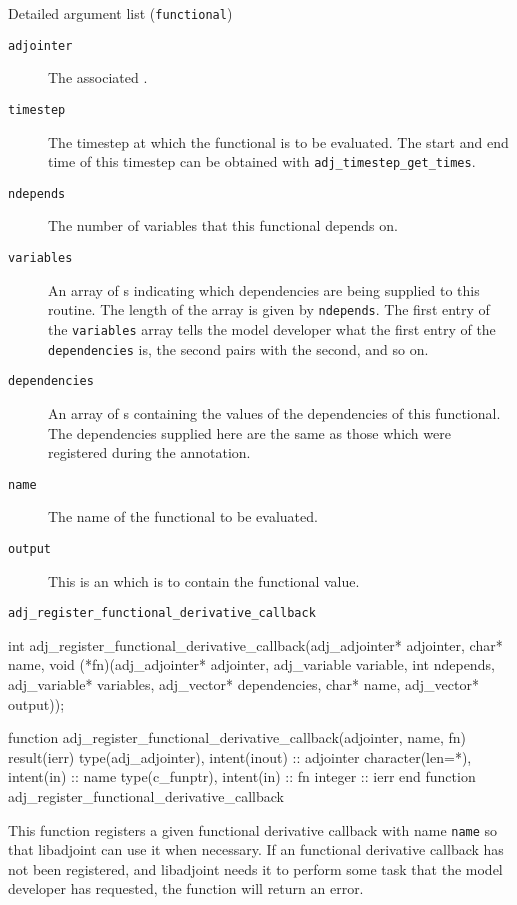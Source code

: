 \begin{boxwithtitle}{Detailed argument list (\texttt{functional})}
\begin{description}
\item[\texttt{adjointer}] The associated .
\item[\texttt{timestep}] The timestep at which the functional is to be evaluated. The start and end time of this timestep can be obtained with \texttt{adj_timestep_get_times}.
\item[\texttt{ndepends}] The number of variables that this functional depends on.
\item[\texttt{variables}] An array of s indicating which dependencies are being supplied to this routine. The length of the
array is given by \texttt{ndepends}. The first entry of the \texttt{variables} array
tells the model developer what the first entry of the \texttt{dependencies} is, the second pairs with the second, and so on.
\item[\texttt{dependencies}] An array of s containing the values of the dependencies of this functional. The dependencies supplied
here are the same as those which were registered during the annotation.
\item[\texttt{name}] The name of the functional to be evaluated.
\item[\texttt{output}] This is an  which is to contain the functional value. 
\end{description}
\end{boxwithtitle}


\begin{boxwithtitle}{\texttt{adj_register_functional_derivative_callback}}
\begin{minipage}{\columnwidth}
\begin{ccode}
  int adj_register_functional_derivative_callback(adj_adjointer* adjointer, 
                      char* name, 
                      void (*fn)(adj_adjointer* adjointer, 
                                 adj_variable variable, int ndepends, 
                                 adj_variable* variables, adj_vector* dependencies, 
                                 char* name, adj_vector* output));
\end{ccode}
\begin{fortrancode}
  function adj_register_functional_derivative_callback(adjointer, name, fn) 
      result(ierr)
    type(adj_adjointer), intent(inout) :: adjointer
    character(len=*), intent(in) :: name
    type(c_funptr), intent(in) :: fn
    integer :: ierr
  end function adj_register_functional_derivative_callback
\end{fortrancode}
\end{minipage}
\end{boxwithtitle}
This function registers a given functional derivative callback with name \texttt{name} so that libadjoint can use
it when necessary. 
If an functional derivative callback has not been registered, and libadjoint needs it to perform some task that the model developer has
requested, the function will return an  error.

